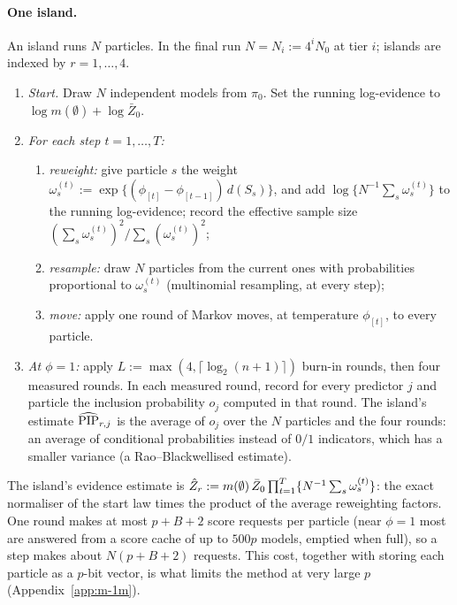\documentclass[11pt]{article}
\newcommand{\grid}[1]{\phi_{[#1]}}  %
\begin{document}
\paragraph{One island.} An island runs $N$ particles. In the final run $N=N_i:=4^iN_0$ at tier $i$; islands are indexed
by $r=1,\dots,4$.
\begin{enumerate}[leftmargin=1.8em,itemsep=2pt]
  \item \emph{Start.} Draw $N$ independent models from $\pi_0$. Set the running log-evidence to
    $\log m(\emptyset)+\log\bar Z_0$.
  \item \emph{For each step $t=1,\dots,T$:}
  \begin{enumerate}[label=(\alph*),itemsep=1pt]
    \item \emph{reweight:} give particle $s$ the weight $\omega^{(t)}_s:=\exp\{(\grid t-\grid{t-1})\,d(S_s)\}$, and add
      $\log\{N^{-1}\sum_s\omega^{(t)}_s\}$ to the running log-evidence; record the effective sample size
      $(\sum_s\omega^{(t)}_s)^2/\sum_s(\omega^{(t)}_s)^2$;
    \item \emph{resample:} draw $N$ particles from the current ones with probabilities proportional to $\omega^{(t)}_s$
      (multinomial resampling, at every step);
    \item \emph{move:} apply one round of Markov moves, at temperature $\grid t$, to every particle.
  \end{enumerate}
  \item \emph{At $\phi=1$:} apply $L:=\max(4,\lceil\log_2(n+1)\rceil)$ burn-in rounds, then four measured rounds. In each
    measured round, record for every predictor $j$ and particle the inclusion probability $o_j$ computed in that round.
    The island's estimate $\widehat{\mathrm{PIP}}_{r,j}$ is the average of $o_j$ over the $N$ particles and the four rounds: an average of
    conditional probabilities instead of $0/1$ indicators, which has a smaller variance (a Rao--Blackwellised estimate).
\end{enumerate}
The island's evidence estimate is $\hat Z_r:=m(\emptyset)\,\bar Z_0\prod_{t=1}^T\{N^{-1}\sum_s\omega_s^{(t)}\}$: the exact
normaliser of the start law times the product of the average reweighting factors. One round makes at most $p+B+2$ score
requests per particle (near $\phi=1$ most are answered from a score cache of up to $500p$ models, emptied when full), so
a step makes about $N(p+B+2)$ requests. This cost, together with storing each particle as a $p$-bit vector, is what limits
the method at very large $p$ (Appendix~\ref{app:m-1m}).
\end{document}
